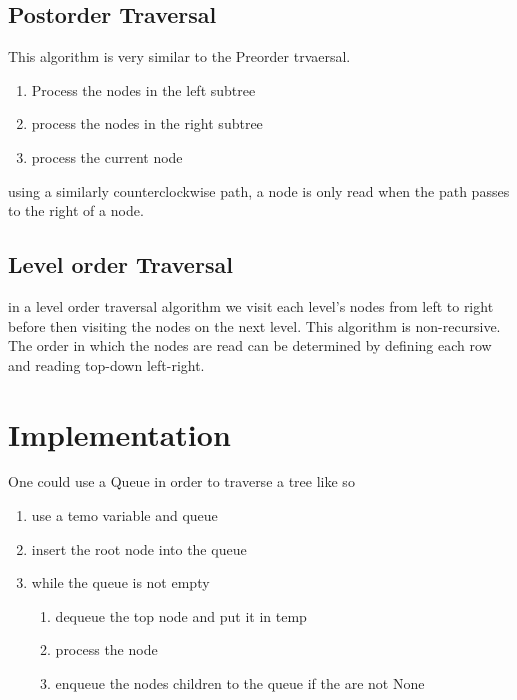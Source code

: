 \documentclass[12pt]{book}
\begin{document}
\subsection*{Postorder Traversal}
This algorithm is very similar to the Preorder trvaersal.
\begin{enumerate}
        \item Process the nodes in the left subtree
        \item process the nodes in the right subtree
        \item process the current node
\end{enumerate}
using a similarly counterclockwise path, a node is only read when the path passes to the right of a node.

\subsection*{Level order Traversal}
in a level order traversal algorithm we visit each level's nodes from left to right before then visiting the nodes on the next level.
This algorithm is non-recursive.
The order in which the nodes are read can be determined by defining each row and reading top-down left-right.

\section*{Implementation}
One could use a Queue in order to traverse a tree like so
\begin{enumerate}
        \item use a temo variable and queue
        \item insert the root node into the queue
        \item while the queue is not empty
        \begin{enumerate}
                \item dequeue the top node and put it in temp
                \item process the node
                \item enqueue the nodes children to the queue if the are not None
        \end{enumerate}
\end{enumerate}
\end{document}
